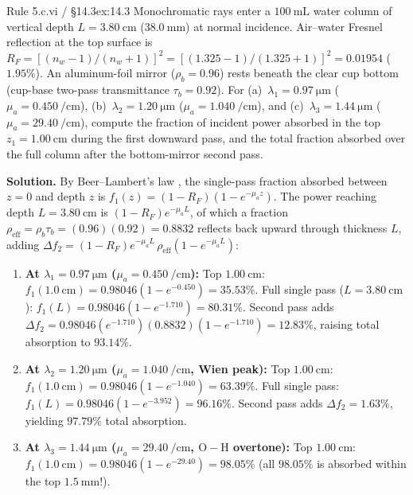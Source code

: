 \begin{workedexample}{Rule 5.c.vi / §14.3}{ex:14.3}
Monochromatic rays enter a $\SI{100}{\milli\liter}$ water column of vertical depth $L = \SI{3.80}{\centi\meter}$ ($\SI{38.0}{\milli\meter}$) at normal incidence. Air--water Fresnel reflection at the top surface is $R_F = [(n_w - 1)/(n_w + 1)]^2 = [(1.325 - 1)/(1.325 + 1)]^2 = 0.01954$ ($1.95\%$). An aluminum-foil mirror ($\rho_b = 0.96$) rests beneath the clear cup bottom (cup-base two-pass transmittance $\tau_b = 0.92$). For (a)~$\lambda_1 = \SI{0.97}{\micro\meter}$ ($\mu_a = \SI{0.450}{\per\centi\meter}$), (b)~$\lambda_2 = \SI{1.20}{\micro\meter}$ ($\mu_a = \SI{1.040}{\per\centi\meter}$), and (c)~$\lambda_3 = \SI{1.44}{\micro\meter}$ ($\mu_a = \SI{29.40}{\per\centi\meter}$), compute the fraction of incident power absorbed in the top $z_1 = \SI{1.00}{\centi\meter}$ during the first downward pass, and the total fraction absorbed over the full column after the bottom-mirror second pass.

\textbf{Solution.} By Beer--Lambert's law , the single-pass fraction absorbed between $z=0$ and depth $z$ is $f_1(z) = (1 - R_F)(1 - e^{-\mu_a z})$. The power reaching depth $L = \SI{3.80}{\centi\meter}$ is $(1-R_F)e^{-\mu_a L}$, of which a fraction $\rho_{\mathrm{eff}} = \rho_b\tau_b = (0.96)(0.92) = 0.8832$ reflects back upward through thickness $L$, adding $\Delta f_2 = (1-R_F)e^{-\mu_a L}\,\rho_{\mathrm{eff}}(1 - e^{-\mu_a L})$:
\begin{enumerate}
  \item \textbf{At $\lambda_1 = \SI{0.97}{\micro\meter}$ ($\mu_a = \SI{0.450}{\per\centi\meter}$):} Top $\SI{1.00}{\centi\meter}$: $f_1(\SI{1.0}{\centi\meter}) = 0.98046(1 - e^{-0.450}) = \mathbf{35.53\%}$. Full single pass ($L=\SI{3.80}{\centi\meter}$): $f_1(L) = 0.98046(1 - e^{-1.710}) = 80.31\%$. Second pass adds $\Delta f_2 = 0.98046(e^{-1.710})(0.8832)(1 - e^{-1.710}) = \mathbf{12.83\%}$, raising total absorption to $\mathbf{93.14\%}$.
  \item \textbf{At $\lambda_2 = \SI{1.20}{\micro\meter}$ ($\mu_a = \SI{1.040}{\per\centi\meter}$, Wien peak):} Top $\SI{1.00}{\centi\meter}$: $f_1(\SI{1.0}{\centi\meter}) = 0.98046(1 - e^{-1.040}) = \mathbf{63.39\%}$. Full single pass: $f_1(L) = 0.98046(1 - e^{-3.952}) = 96.16\%$. Second pass adds $\Delta f_2 = \mathbf{1.63\%}$, yielding $\mathbf{97.79\%}$ total absorption.
  \item \textbf{At $\lambda_3 = \SI{1.44}{\micro\meter}$ ($\mu_a = \SI{29.40}{\per\centi\meter}$, $\mathrm{O-H}$ overtone):} Top $\SI{1.00}{\centi\meter}$: $f_1(\SI{1.0}{\centi\meter}) = 0.98046(1 - e^{-29.40}) = \mathbf{98.05\%}$ (all $98.05\%$ is absorbed within the top $\SI{1.5}{\milli\meter}$!).
\end{enumerate}
\end{workedexample}

